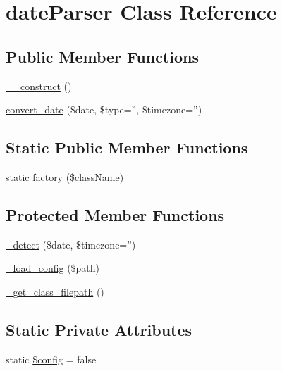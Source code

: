 \hypertarget{classdateParser}{
\section{dateParser Class Reference}
\label{classdateParser}
}
\subsection*{Public Member Functions}
\begin{DoxyCompactItemize}
\item 
\hyperlink{classdateParser_a095c5d389db211932136b53f25f39685}{\_\-\_\-construct} ()
\item 
\hyperlink{classdateParser_a1fbc5fa684cb87ef9cc0afeb96e50121}{convert\_\-date} (\$date, \$type='', \$timezone='')
\end{DoxyCompactItemize}
\subsection*{Static Public Member Functions}
\begin{DoxyCompactItemize}
\item 
static \hyperlink{classdateParser_a8c0508f1ea0fe72c8d0e6e8dd2a1c41c}{factory} (\$className)
\end{DoxyCompactItemize}
\subsection*{Protected Member Functions}
\begin{DoxyCompactItemize}
\item 
\hyperlink{classdateParser_af3690b8603e5a936765d05c5c28c6a37}{\_\-detect} (\$date, \$timezone='')
\item 
\hyperlink{classdateParser_ac3c8987c95826d5c587c1d4580a52767}{\_\-load\_\-config} (\$path)
\item 
\hyperlink{classdateParser_a692eae517eec6c07940dd935006f6bd2}{\_\-get\_\-class\_\-filepath} ()
\end{DoxyCompactItemize}
\subsection*{Static Private Attributes}
\begin{DoxyCompactItemize}
\item 
static \hyperlink{classdateParser_a49c7011be9c979d9174c52a8b83e5d8e}{\$config} = false
\end{DoxyCompactItemize}


